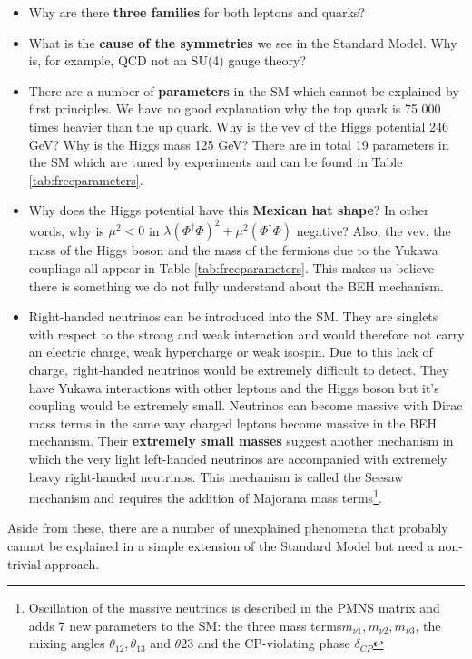 \begin{itemize}
\item Why are there \textbf{three families} for both leptons and quarks? 
\item What is the \textbf{cause of the symmetries} we see in the Standard Model. Why is, for example, QCD not an SU(4) gauge theory?
\item There are a number of \textbf{parameters} in the SM which cannot be explained by first principles. We have no good explanation why the top quark is 75 000 times heavier than the up quark. Why is the vev of the Higgs potential 246 GeV? Why is the Higgs mass 125 GeV? There are in total 19 parameters in the SM which are tuned by experiments and can be found in Table \ref{tab:freeparameters}.
\item Why does the Higgs potential have this\textbf{ Mexican hat shape}? In other words, why is $\mu^2 < 0$ in $\lambda \left(\Phi^\dagger \Phi \right)^2 + \mu^2\left(\Phi^\dagger \Phi \right)$ negative? Also, the vev, the mass of the Higgs boson and the mass of the fermions due to the Yukawa couplings all appear in Table \ref{tab:freeparameters}. This makes us believe there is something we do not fully understand about the BEH mechanism. 
\item Right-handed neutrinos can be introduced into the SM. They are singlets with respect to the strong and weak interaction and would therefore not carry an electric charge, weak hypercharge or weak isospin. Due to this lack of charge, right-handed neutrinos would be extremely difficult to detect. They have Yukawa interactions with other leptons and the Higgs boson but it's coupling would be extremely small. Neutrinos can become massive with Dirac mass terms in the same way charged leptons become massive in the BEH mechanism. Their \textbf{extremely small masses} suggest another mechanism in which the very light left-handed neutrinos are accompanied with extremely heavy right-handed neutrinos. This mechanism is called the Seesaw mechanism and requires the addition of Majorana mass terms\footnote{Oscillation of the massive neutrinos is described in the PMNS matrix and adds 7 new parameters to the SM: the three mass terms$m_{\nu1},m_{\nu2},m_{\nu3}$, the mixing angles $\theta_{12},\theta_{13}$ and $\theta{23}$ and the CP-violating phase $\delta_{CP}$ }.
\end{itemize}

\noindent Aside from these, there are a number of unexplained phenomena that probably cannot be explained in a simple extension of the Standard Model but need a non-trivial approach. 

